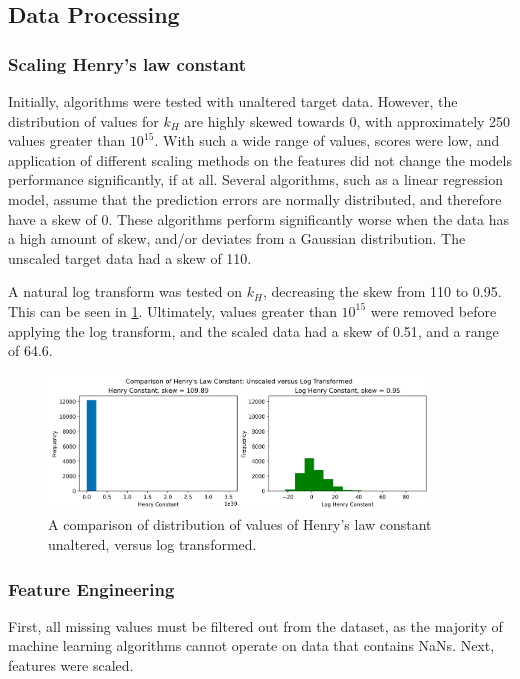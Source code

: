 \documentclass[11pt, titlepage]{article}
\begin{document}
\subsection{Data Processing}
\label{subsec:dataProcessing}

\subsubsection{Scaling Henry's law constant}
\label{subsubsec{ScalingHL}}
Initially, algorithms were tested with unaltered target data. However, the distribution of values for {$k_H$} are highly skewed towards 0, with approximately 250 values greater than $10^{15}$. With such a wide range of values, scores were low, and application of different scaling methods on the features did not change the models performance significantly, if at all. Several algorithms, such as a linear regression model, assume that the prediction errors are normally distributed, and therefore have a skew of 0\cite{HandsOnML, FeatEngForML}. These algorithms perform significantly worse when the data has a high amount of skew, and/or deviates from a Gaussian distribution. The unscaled target data had a skew of 110. 

A natural log transform was tested on {$k_H$}, decreasing the skew from 110 to 0.95. This can be seen in \ref{fig:kH_Dist}. Ultimately, values greater than $10^{15}$ were removed before applying the log transform, and the scaled data had a skew of 0.51, and a range of 64.6.

\begin{figure}[!h]
	\centering
	\includegraphics[width=0.9\textwidth]{figures/kH_Scaling.png}
	\caption{A comparison of distribution of values of Henry's law constant unaltered, versus log transformed.}
	\label{fig:kH_Dist}
\end{figure}

\subsubsection{Feature Engineering}
\label{subsubsec:FeatEng}
First, all missing values must be filtered out from the dataset, as the majority of machine learning algorithms cannot operate on data that contains NaNs. Next, features were scaled. 
\end{document}
